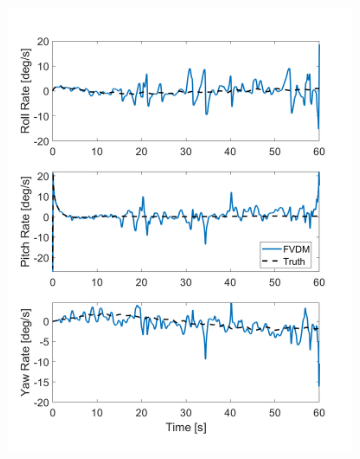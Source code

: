 \begin{figure}[!ht]
    \begin{subfigure}{.45\textwidth}
        \centering
        \includegraphics[width=1\linewidth]{Figures/dynamic/15/ANGULARRATES.png}
    \end{subfigure}
    \begin{subfigure}{.45\textwidth}
        \centering

\end{subfigure}
\end{figure}

